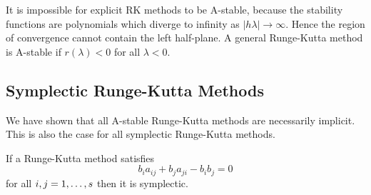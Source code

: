 It is impossible for explicit RK methods to be A-stable, because the stability functions are polynomials which diverge to infinity as $|h\lambda| \rightarrow \infty$.
Hence the region of convergence cannot contain the left half-plane.
A general Runge-Kutta method is A-stable if $r(\lambda) < 0$ for all $\lambda < 0$.

\subsection{Symplectic Runge-Kutta Methods}

We have shown that all A-stable Runge-Kutta methods are necessarily implicit.
This is also the case for all symplectic Runge-Kutta methods.

\begin{theorem}
\label{thm:symrk}
If a Runge-Kutta method satisfies
\begin{equation}
	b_i a_{ij} + b_j a_{ji} - b_i b_j = 0
\end{equation}
for all $i, j = 1, \mathellipsis, s$ then it is symplectic.
\end{theorem}
